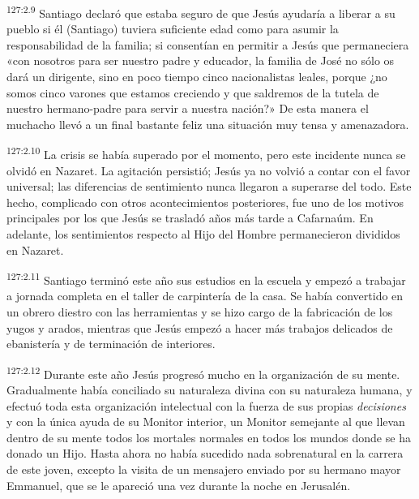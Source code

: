 \par 
\textsuperscript{127:2.9} Santiago declaró que estaba seguro de que Jesús ayudaría a liberar a su pueblo si él (Santiago) tuviera suficiente edad como para asumir la responsabilidad de la familia; si consentían en permitir a Jesús que permaneciera «con nosotros para ser nuestro padre y educador, la familia de José no sólo os dará un dirigente, sino en poco tiempo cinco nacionalistas leales, porque ¿no somos cinco varones que estamos creciendo y que saldremos de la tutela de nuestro hermano-padre para servir a nuestra nación?» De esta manera el muchacho llevó a un final bastante feliz una situación muy tensa y amenazadora.

\par 
\textsuperscript{127:2.10} La crisis se había superado por el momento, pero este incidente nunca se olvidó en Nazaret. La agitación persistió; Jesús ya no volvió a contar con el favor universal; las diferencias de sentimiento nunca llegaron a superarse del todo. Este hecho, complicado con otros acontecimientos posteriores, fue uno de los motivos principales por los que Jesús se trasladó años más tarde a Cafarnaúm. En adelante, los sentimientos respecto al Hijo del Hombre permanecieron divididos en Nazaret.

\par 
\textsuperscript{127:2.11} Santiago terminó este año sus estudios en la escuela y empezó a trabajar a jornada completa en el taller de carpintería de la casa. Se había convertido en un obrero diestro con las herramientas y se hizo cargo de la fabricación de los yugos y arados, mientras que Jesús empezó a hacer más trabajos delicados de ebanistería y de terminación de interiores.

\par 
\textsuperscript{127:2.12} Durante este año Jesús progresó mucho en la organización de su mente. Gradualmente había conciliado su naturaleza divina con su naturaleza humana, y efectuó toda esta organización intelectual con la fuerza de sus propias \textit{decisiones} y con la única ayuda de su Monitor interior, un Monitor semejante al que llevan dentro de su mente todos los mortales normales en todos los mundos donde se ha donado un Hijo. Hasta ahora no había sucedido nada sobrenatural en la carrera de este joven, excepto la visita de un mensajero enviado por su hermano mayor Emmanuel, que se le apareció una vez durante la noche en Jerusalén.

